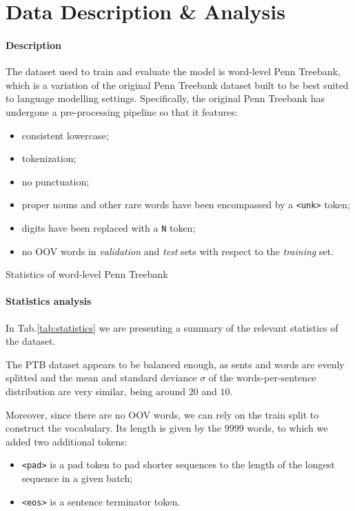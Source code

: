 \section{Data Description \& Analysis}
\label{sec:3_data}
\paragraph*{Description}
The dataset used to train and evaluate the model is word-level Penn Treebank\cite{marcus1993building}, which is a variation of the original Penn Treebank dataset built to be best suited to language modelling settings. 
Specifically, the original Penn Treebank has undergone a pre-processing pipeline so that it features:

\begin{itemize}
    \item consistent lowercase;
    \item tokenization;
    \item no punctuation;
    \item proper nouns and other rare words have been encompassed by a \texttt{<unk>} token;
    \item digits have been replaced with a \texttt{N} token;
    \item no OOV words in \emph{validation} and \emph{test} sets with respect to the \emph{training} set.
\end{itemize}

\begin{table}
    
    \caption{Statistics of word-level Penn Treebank}
    \label{tab:statistics}
\end{table}

\paragraph*{Statistics analysis}
In Tab.\ref{tab:statistics} we are presenting a summary of the relevant statistics of the dataset.

The PTB dataset appears to be balanced enough, as sents and words are evenly splitted and the mean and standard deviance \(\sigma\) of the words-per-sentence distribution are very similar, being around \(20\) and \(10\).

Moreover, since there are no OOV words, we can rely on the train split to construct the vocabulary. Its length is given by the \(9999\) words, to which we added two additional tokens:
\begin{itemize}
    \item \texttt{<pad>} is a pad token to pad shorter sequences to the length of the longest sequence in a given batch;
    \item \texttt{<eos>} is a sentence terminator token.
\end{itemize}

